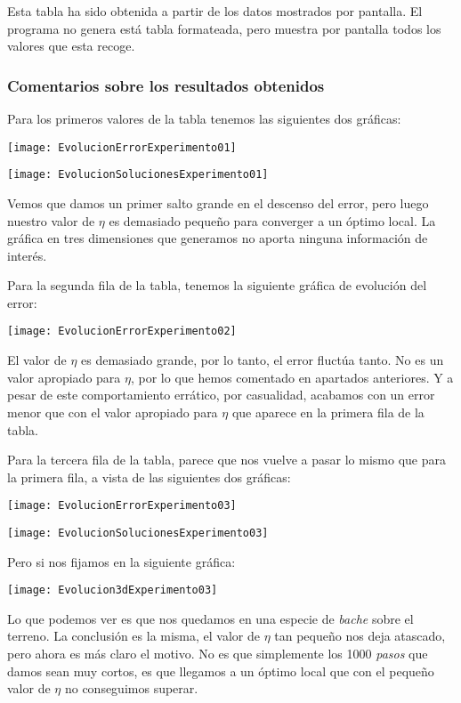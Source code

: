 \documentclass[11pt]{article}
\begin{document}
Esta tabla ha sido obtenida a partir de los datos mostrados por pantalla. El programa no genera está tabla formateada, pero muestra por pantalla todos los valores que esta recoge.

\subsubsection{Comentarios sobre los resultados obtenidos}

Para los primeros valores de la tabla tenemos las siguientes dos gráficas:

\texttt{[image: EvolucionErrorExperimento01]}

\texttt{[image: EvolucionSolucionesExperimento01]}

Vemos que damos un primer salto grande en el descenso del error, pero luego nuestro valor de $\eta$ es demasiado pequeño para converger a un óptimo local. La gráfica en tres dimensiones que generamos no aporta ninguna información de interés.

Para la segunda fila de la tabla, tenemos la siguiente gráfica de evolución del error:

\texttt{[image: EvolucionErrorExperimento02]}

El valor de $\eta$ es demasiado grande, por lo tanto, el error fluctúa tanto. No es un valor apropiado para $\eta$, por lo que hemos comentado en apartados anteriores. Y a pesar de este comportamiento errático, por casualidad, acabamos con un error menor que con el valor apropiado para $\eta$ que aparece en la primera fila de la tabla.

Para la tercera fila de la tabla, parece que nos vuelve a pasar lo mismo que para la primera fila, a vista de las siguientes dos gráficas:

\texttt{[image: EvolucionErrorExperimento03]}

\texttt{[image: EvolucionSolucionesExperimento03]}

Pero si nos fijamos en la siguiente gráfica:

\texttt{[image: Evolucion3dExperimento03]}

Lo que podemos ver es que nos quedamos en una especie de \emph{bache} sobre el terreno. La conclusión es la misma, el valor de $\eta$ tan pequeño nos deja atascado, pero ahora es más claro el motivo. No es que simplemente los 1000 \emph{pasos} que damos sean muy cortos, es que llegamos a un óptimo local que con el pequeño valor de $\eta$ no conseguimos superar.
\end{document}
